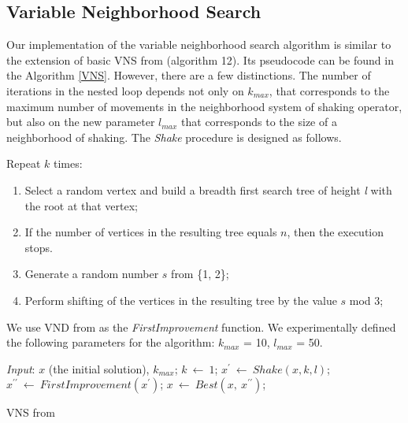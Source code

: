 \documentclass[runningheads]{llncs}
\begin{document}
\subsection{Variable Neighborhood Search}
Our implementation of the variable neighborhood search algorithm is similar to the extension of basic VNS from \cite{Hansen:08} (algorithm 12). Its pseudocode can be found in the Algorithm \ref{VNS}. However, there are a few distinctions. The number of iterations in the nested loop depends not only on $k_{max}$, that corresponds to the maximum number of movements in the neighborhood system of shaking operator, but also on the new parameter $l_{max}$ that corresponds to the size of a neighborhood of shaking. The \textit{Shake} procedure is designed as follows.

Repeat $k$ times:

\begin{enumerate} [itemsep=1em]
\item Select a random vertex and build a breadth first search tree of height \textit{l} with the root at that vertex;
\item If the number of vertices in the resulting tree equals $n$, then the execution stops.
\item Generate a random number $s$ from \{1, 2\};
\item Perform shifting of the vertices in the resulting tree by the value $s$ mod 3;
\end{enumerate}
We use VND from \cite{Erzin:24} as the \textit{FirstImprovement} function. We experimentally defined the following parameters for the algorithm: $k_{max}$ = 10, $l_{max}$ = 50.\\

\begin{algorithm}[!hbtp]
\begin{algorithmic}[1]
\STATE \emph{Input}: $x$ (the initial solution), $k_{max}$;
    \STATE $k \: \leftarrow \: 1$;
    \REPEAT
            \STATE $x^{\prime} \: \leftarrow \: Shake(x, k, l)$;
            \STATE $x^{\prime \prime} \: \leftarrow \: FirstImprovement(x^{\prime})$;
            \STATE $x \: \leftarrow \: Best(x, \: x^{\prime \prime})$;
        \ENDFOR
\ENDWHILE
\end{algorithmic}
\caption{VNS from \cite{Hansen:08}} \label{VNS}
\end{algorithm}
\end{document}
